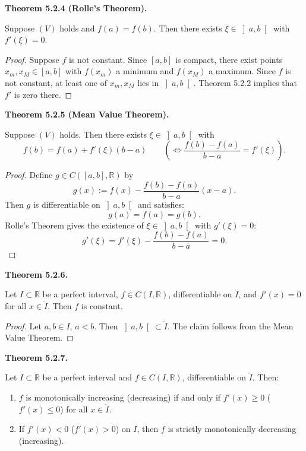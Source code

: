 \documentclass[12pt]{article}
\newenvironment{satz}[1]{%
  \par\vspace{6pt}\noindent\textbf{Theorem #1.}\itshape\space
}{%
  \par\vspace{6pt}
}
\begin{document}
\begin{satz}{5.2.4 (Rolle's Theorem)}
Suppose $(V)$ holds and $f(a) = f(b)$. Then there exists $\xi \in \left]a, b\right[$ with $f'(\xi) = 0$.
\end{satz}

\begin{proof}
Suppose $f$ is not constant. Since $[a,b]$ is compact, there exist points $x_m, x_M \in [a,b]$ with $f(x_m)$ a minimum and $f(x_M)$ a maximum. Since $f$ is not constant, at least one of $x_m, x_M$ lies in $\left]a, b\right[$. Theorem 5.2.2 implies that $f'$ is zero there.
\end{proof}

\begin{satz}{5.2.5 (Mean Value Theorem)}
Suppose $(V)$ holds. Then there exists $\xi \in \left]a, b\right[$ with
\[
    f(b) = f(a) + f'(\xi)(b-a) \qquad \left(\iff \frac{f(b)-f(a)}{b-a} = f'(\xi)\right).
\]
\end{satz}

\begin{proof}
Define $g \in C([a,b], \mathbb{R})$ by
\[
    g(x) := f(x) - \frac{f(b)-f(a)}{b-a}(x-a).
\]
Then $g$ is differentiable on $\left]a,b\right[$ and satisfies:
\[
    g(a) = f(a) = g(b).
\]
Rolle's Theorem gives the existence of $\xi \in \left]a,b\right[$ with $g'(\xi) = 0$:
\[
    g'(\xi) = f'(\xi) - \frac{f(b)-f(a)}{b-a} = 0.
\]
\end{proof}

\begin{satz}{5.2.6}
Let $I \subset \mathbb{R}$ be a perfect interval, $f \in C(I, \mathbb{R})$, differentiable on $\mathring{I}$, and $f'(x) = 0$ for all $x \in \mathring{I}$. Then $f$ is constant.
\end{satz}

\begin{proof}
Let $a, b \in I$, $a < b$. Then $\left]a,b\right[ \subset \mathring{I}$. The claim follows from the Mean Value Theorem.
\end{proof}

\begin{satz}{5.2.7}
Let $I \subset \mathbb{R}$ be a perfect interval and $f \in C(I, \mathbb{R})$, differentiable on $\mathring{I}$. Then:
\begin{enumerate}
    \item $f$ is monotonically increasing (decreasing) if and only if $f'(x) \geq 0$ ($f'(x) \leq 0$) for all $x \in \mathring{I}$.
    \item If $f'(x) < 0$ ($f'(x) > 0$) on $I$, then $f$ is strictly monotonically decreasing (increasing).
\end{enumerate}
\end{satz}
\end{document}

